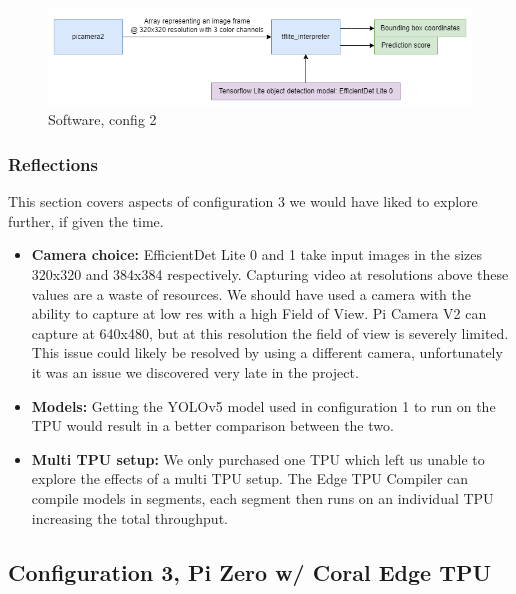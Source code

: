 \begin{figure}[H]
    \centering
    \includegraphics[scale=0.5]{fig/config_2_3_software_highlevel.drawio.png}
    \caption{Software, config 2}
    \label{fig:config2_sw}
\end{figure}

\subsubsection{Reflections}
This section covers aspects of configuration 3 we would have liked to explore further, if given the time.\\
\begin{itemize}
\item \textbf{Camera choice:} EfficientDet Lite 0 and 1 take input images in the sizes 320x320 and 384x384 respectively. Capturing video at resolutions above these values are a waste of resources. We should have used a camera with the ability to capture at low res with a high Field of View. Pi Camera V2 can capture at 640x480, but at this resolution the field of view is severely limited\cite{picameraFOV}. This issue could likely be resolved by using a different camera, unfortunately it was an issue we discovered very late in the project.
\item \textbf{Models:} Getting the YOLOv5 model used in configuration 1 to run on the TPU would result in a better comparison between the two.
\item \textbf{Multi TPU setup:} We only purchased one TPU which left us unable to explore the effects of a multi TPU setup. The Edge TPU Compiler can compile models in segments, each segment then runs on an individual TPU increasing the total throughput.
\end{itemize}




\subsection{Configuration 3, Pi Zero w/ Coral Edge TPU}


